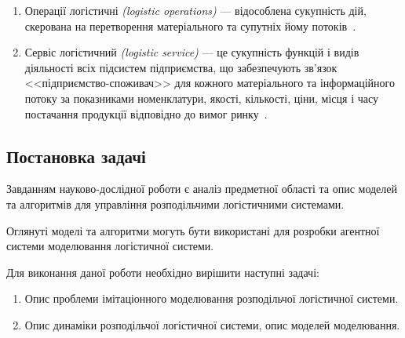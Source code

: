 \begin{enumerate}
    \item Операції логістичні \textit{(logistic operations)} --- відособлена сукупність дій, скерована на перетворення матеріального та супутніх йому потоків~\cite{Kusluy2010}.
    \item Сервіс логістичний \textit{(logistic service)} --- це сукупність функцій і видів діяльності всіх підсистем підприємства, що забезпечують зв’язок <<підприємство-споживач>> для кожного матеріального та інформаційного потоку за показниками номенклатури, якості, кількості, ціни, місця і часу постачання продукції відповідно до вимог ринку~\cite{Kusluy2010}.
\end{enumerate}

\subsection{Постановка задачі}
Завданням науково-дослідної роботи є аналіз предметної області та опис моделей та алгоритмів для управління розподільчими логістичними системами.

Оглянуті моделі та алгоритми могуть бути використані для розробки агентної системи моделювання логістичної системи.

Для виконання даної роботи необхідно вирішити наступні задачі:
\begin{enumerate}
	\item Опис проблеми імітаціонного моделювання розподільчої логістичної системи.
	\item Опис динаміки розподільчої логістичної системи, опис моделей моделювання.
\end{enumerate}
